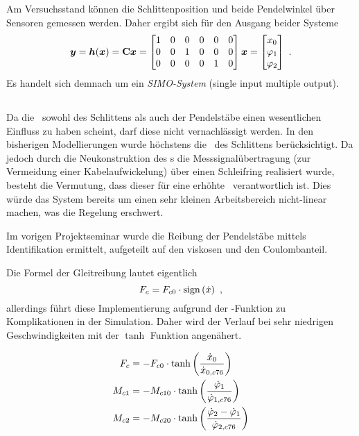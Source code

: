 Am Versuchsstand können die Schlittenposition und beide Pendelwinkel über Sensoren gemessen werden. Daher ergibt sich für den Ausgang beider Systeme
\begin{align}
	\boldsymbol{y} = \boldsymbol{h}(\boldsymbol{x})
	= {\boldsymbol{\mathrm{C}}} \boldsymbol{x}
	= \begin{bmatrix}
		1 & 0 & 0 & 0 & 0 & 0 \\
		0 & 0 & 1 & 0 & 0 & 0 \\
		0 & 0 & 0 & 0 & 1 & 0 
	\end{bmatrix} \boldsymbol{x}
	= \begin{bmatrix}
		x_0 \\ \varphi_1 \\ \varphi_2
	\end{bmatrix}  \ .
	\label{eq:hx}
\end{align}
Es handelt sich demnach um ein \emph{SIMO-System} (single input multiple output). 


\subsection{\crb}\label{sec:crb}

Da die \crb\ sowohl des Schlittens als auch der Pendelstäbe einen wesentlichen Einfluss zu haben scheint, darf diese nicht vernachlässigt werden. 
In den bisherigen Modellierungen wurde höchstens die \crb\ des Schlittens berücksichtigt. 
Da jedoch durch die Neukonstruktion des \dpd s die Messsignalübertragung (zur Vermeidung einer Kabelaufwickelung) über einen Schleifring realisiert wurde, besteht die Vermutung, dass dieser für eine erhöhte \crb\ verantwortlich ist. 
Dies würde das System bereits um einen sehr kleinen Arbeitsbereich nicht-linear machen, was die Regelung erschwert.

Im vorigen Projektseminar \cite{ribeiro} wurde die Reibung der Pendelstäbe mittels Identifikation ermittelt, aufgeteilt auf den viskosen und den Coulombanteil.

Die Formel der Gleitreibung lautet eigentlich 
	\[
	F_c = F_{c0}  \cdot  \mathrm{sign}\left(\dot{x}\right) \ ,
\]
allerdings führt diese Implementierung aufgrund der -Funktion zu Komplikationen in der Simulation. 
Daher wird der Verlauf bei sehr niedrigen Geschwindigkeiten mit der $\tanh$ Funktion angenähert.

\begin{align}
	F_c  &= -F_{c0}  \cdot \tanh{\left(\frac{\ensuremath{\dot{x}_0}}{\ensuremath{\dot{x}_{0,c76}}}\right)}  \\
	M_{c1} &= -M_{c10} \cdot \tanh{\left(\frac{\ensuremath{\dot{\varphi}_1}}{\ensuremath{\dot{\varphi}_{1,c76}}}\right)}  \\
	M_{c2} &= -M_{c20} \cdot \tanh{\left(\frac{\ensuremath{\dot{\varphi}_2}-\ensuremath{\dot{\varphi}_1}}{\ensuremath{\dot{\varphi}_{2,c76}}}\right)}
\end{align}

